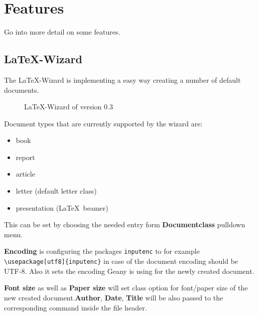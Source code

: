 \documentclass[%
a4paper,%
10pt,%
oneside,%
DIV18,
headsepline,
plainheadsepline,
footsepline,
plainfootsepline,
bibtotoc,%
liststotoc,%
BCOR12mm,%
halfparskip,%
openany,%
]{scrartcl}
\begin{document}
\section{Features}

Go into more detail on some features.

\subsection{\LaTeX-Wizard}

The \LaTeX-Wizard is implementing a easy way creating a number of
default documents.
\begin{figure}[h!]
	\caption{\LaTeX-Wizard of version 0.3}
\end{figure}

Document types that are currently supported by the wizard are:
\begin{itemize}
	\item book
	\item report
	\item article
	\item letter (default letter class)
	\item presentation (\LaTeX\ beamer)
\end{itemize}

This can be set by choosing the needed entry form
\textbf{Documentclass} pulldown menu.

\textbf{Encoding} is configuring the packages \texttt{inputenc} to
for example \texttt{\textbackslash usepackage[utf8]\{inputenc\}} in
case of the document encoding should be UTF-8. Also it sets the
encoding Geany is using for the newly created document.

\textbf{Font size} as well as \textbf{Paper size} will set class option
for font/paper size of the new created document.\textbf{Author},
\textbf{Date}, \textbf{Title} will be also passed to the corresponding
command inside the file header.
\end{document}
